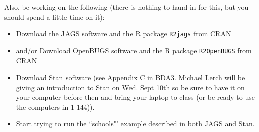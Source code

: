 \documentclass[12pt]{article}
\begin{document}
\vspace{1cm}

Also, be working on the following (there is nothing to hand in for this, but you should spend a little time on it):
  \begin{itemize}
  \item Download the JAGS software and the R package \verb^R2jags^ from CRAN
  \item and/or Download OpenBUGS software and the R package \verb^R2OpenBUGS^ from CRAN
	\item Download Stan software (see Appendix C in BDA3.  Michael Lerch will be giving an introduction to Stan on Wed. Sept 10th so be sure to have it on your computer before then and bring your laptop to class (or be ready to use the computers in 1-144)).
  \item Start trying to run the ``schools"' example described in both JAGS and Stan.
  
\end{itemize}
\end{document}
